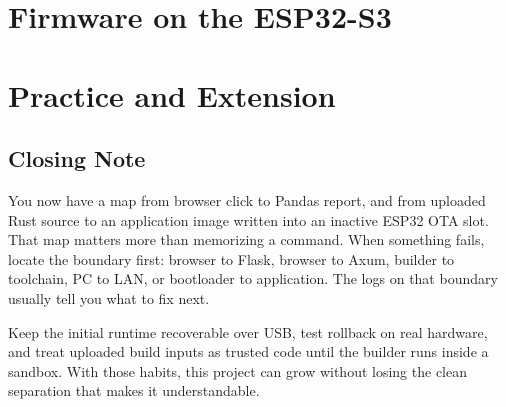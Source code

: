 \documentclass[11pt,letterpaper,openany]{book}
\begin{document}
\part{Firmware on the ESP32-S3}




\part{Practice and Extension}




\appendix



\backmatter
\chapter*{Closing Note}
You now have a map from browser click to Pandas report, and from uploaded Rust source to an application image written into an inactive ESP32 OTA slot. That map matters more than memorizing a command. When something fails, locate the boundary first: browser to Flask, browser to Axum, builder to toolchain, PC to LAN, or bootloader to application. The logs on that boundary usually tell you what to fix next.

Keep the initial runtime recoverable over USB, test rollback on real hardware, and treat uploaded build inputs as trusted code until the builder runs inside a sandbox. With those habits, this project can grow without losing the clean separation that makes it understandable.
\end{document}
